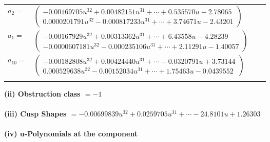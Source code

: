 \documentclass[1p]{elsarticle_modified}
\theoremstyle{definition}
\begin{document}
\begin{tabular}{m{7pt} m{180pt} m{7pt} m{180pt} }
\flushright $a_{2}=$&$\begin{pmatrix}-0.00169705 u^{32}+0.00482151 u^{31}+\cdots+0.535570 u-2.78065\\0.0000201791 u^{32}-0.000817233 u^{31}+\cdots+3.74671 u-2.43201\end{pmatrix}$ \\
\flushright $a_{1}=$&$\begin{pmatrix}-0.00167929 u^{32}+0.00313362 u^{31}+\cdots+6.43558 u-4.28239\\-0.0000607181 u^{32}-0.000235106 u^{31}+\cdots+2.11291 u-1.40057\end{pmatrix}$ \\
\flushright $a_{10}=$&$\begin{pmatrix}-0.00182808 u^{32}+0.00424440 u^{31}+\cdots-0.0320791 u+3.73144\\0.000529638 u^{32}-0.00152034 u^{31}+\cdots+1.75463 u-0.0439552\end{pmatrix}$\\&\end{tabular}
\flushleft \textbf{(ii) Obstruction class $= -1$}\\~\\
\flushleft \textbf{(iii) Cusp Shapes $= -0.00699839 u^{32}+0.0259705 u^{31}+\cdots-24.8101 u+1.26303$}\\~\\
\newpage\renewcommand{\arraystretch}{1}
\flushleft \textbf{(iv) u-Polynomials at the component}\newline \\
\end{document}
